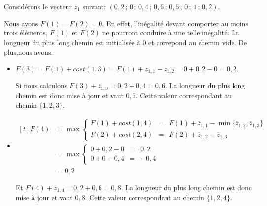\begin{ex}
Considérons le vecteur $\overline{z}_1$ suivant: $(0,2\, ;\, 0\, ;\,
0,4\, ;\, 0,6\, ;\, 0,6\, ;\, 0\, ;\, 1\, ;\, 0,2)$.

Nous avons $F(1)=F(2)=0$. En effet, l'inégalité devant comporter au moins
trois éléments, $F(1)$ et $F(2)$ ne pourront conduire à une telle
inégalité. La longueur du plus long chemin est initialisée à $0$ et
correpond au chemin vide. De plus,nous avons: 
\begin{itemize}
\item $F(3) =  F(1) + cost (1,3) = F(1) + \overline{z}_{1,1} -
  \overline{z}_{1,2} = 0 + 0,2 - 0= 0,2 $. 
  
  Si nous calculons $F(3)+\overline{z}_{1,3}=0,2+0,4=0,6$. La
  longueur du plus long chemin est donc mise à jour et vaut
  $0,6$. Cette valeur correspondant au chemin $\{1,2,3\}$.
\item $\begin{aligned}[t] 
    F(4) &=  \max \left\{
        \begin{array}{lcl}
          F(1) + cost (1,4) & = & F(1) + \overline{z}_{1,1}  -
                              \min\{\overline{z}_{1,2},\overline{z}_{1,3}\}  \\
          F(2) + cost (2,4) &= & F(2) + \overline{z}_{1,2} -
                              \overline{z}_{1,3}     
        \end{array} \right.\\
    &=  \max \left\{ 
        \begin{array}{lcl}
          0 + 0,2 - 0 &=& 0,2\\
          0 + 0 - 0,4 &= &-0,4 
        \end{array} \right.\\
    &=  0,2
  \end{aligned}$

  Et $F(4)+\overline{z}_{1,4}=0,2+0,6=0,8$. La
  longueur du plus long chemin est donc mise à jour et vaut
  $0,8$. Cette valeur correspondant au chemin $\{1,2,4\}$.


\end{itemize}
\end{ex}
